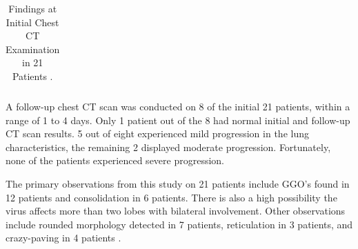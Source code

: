 \begin{longtable}{| p{} | p{} |}
 \caption{Findings at Initial Chest CT Examination in 21 Patients  \cite{CMA+2020}.}

    \label{tab:CT Scan Review Results}
    \end{longtable}

% 
A follow-up chest CT scan was conducted on 8 of the initial 21 patients, within 
a range of 1 to 4 days. Only 1 patient out of the 8 had normal initial and 
follow-up CT scan results. 5 out of eight experienced mild progression in 
the lung characteristics, the remaining 2 displayed 
moderate progression. Fortunately, none of the patients experienced severe progression.

The primary observations from this study on 21 patients include GGO's 
found in 12 patients and consolidation in 6 patients. There is also a high possibility 
the virus affects more than two lobes with bilateral involvement. Other 
observations include rounded morphology detected in 7 patients, 
reticulation in 3 patients, and crazy-paving in 4 patients \cite{CMA+2020}.

